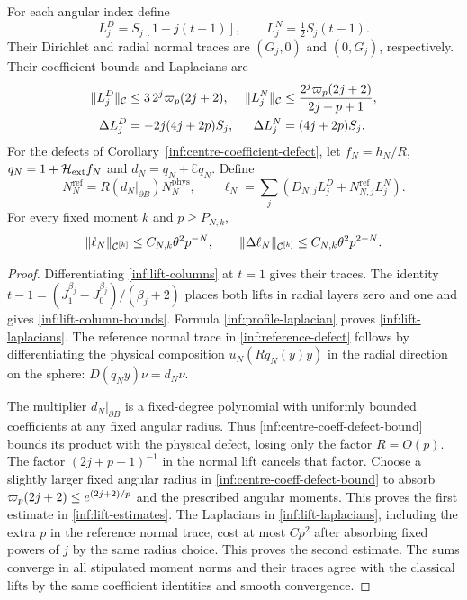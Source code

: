 \begin{lemma}\label{inf:double-lift}
For each angular index define
\begin{equation}\label{inf:lift-columns}
 L_j^D=S_j[1-j(t-1)],\qquad L_j^N=\tfrac12S_j(t-1).
\end{equation}
Their Dirichlet and radial normal traces are $(G_j,0)$ and
$(0,G_j)$, respectively. Their coefficient bounds and Laplacians
are
\begin{align}
 \lVert L_j^D\rVert_\mathcal C&\le3\,2^j\varpi_p(2j+2),&
 \lVert L_j^N\rVert_\mathcal C&\le\frac{2^j\varpi_p(2j+2)}{2j+p+1},
 \label{inf:lift-column-bounds}\\
 \Delta L_j^D&=-2j(4j+2p)S_j,&
 \Delta L_j^N&=(4j+2p)S_j.\label{inf:lift-laplacians}
\end{align}
For the defects of Corollary~\ref{inf:centre-coefficient-defect},
let $f_N=h_N/R$, $q_N=1+\mathcal H_{\mathrm{ext}} f_N$ and
$d_N=q_N+\Euler q_N$. Define
\begin{equation}\label{inf:reference-defect}
 N_N^{\mathrm{ref}}=R(d_N|_{\partial B})N_N^{\mathrm{phys}},
 \qquad
 \ell_N=\sum_j(D_{N,j}L_j^D+N_{N,j}^{\mathrm{ref}}L_j^N).
\end{equation}
For every fixed moment $k$ and $p\ge P_{N,k}$,
\begin{equation}\label{inf:lift-estimates}
 \lVert \ell_N\rVert_{\mathcal C^{[k]}}\le C_{N,k}\theta^2p^{-N},\qquad
 \lVert \Delta\ell_N\rVert_{\mathcal C^{[k]}}\le C_{N,k}\theta^2p^{2-N}.
\end{equation}
\end{lemma}
\begin{proof}
Differentiating \eqref{inf:lift-columns} at $t=1$ gives their
traces. The identity
$t-1=(J_1^{\beta_j}-J_0^{\beta_j})/(\beta_j+2)$
places both lifts in radial layers zero and one and gives
\eqref{inf:lift-column-bounds}. Formula
\eqref{inf:profile-laplacian} proves \eqref{inf:lift-laplacians}.
The reference normal trace in \eqref{inf:reference-defect} follows
by differentiating the physical composition $u_N(Rq_N(y)y)$ in
the radial direction on the sphere: $D(q_Ny)\nu=d_N\nu$.

The multiplier $d_N|_{\partial B}$ is a fixed-degree polynomial
with uniformly bounded coefficients at any fixed angular radius.
Thus \eqref{inf:centre-coeff-defect-bound} bounds its product with
the physical defect, losing only the factor $R=O(p)$.
The factor $(2j+p+1)^{-1}$ in the normal lift cancels that factor.
Choose a slightly larger fixed angular radius in
\eqref{inf:centre-coeff-defect-bound} to absorb
$\varpi_p(2j+2)\le e^{(2j+2)/p}$ and the prescribed angular moments.
This proves the first estimate in \eqref{inf:lift-estimates}.
The Laplacians in \eqref{inf:lift-laplacians}, including the extra
$p$ in the reference normal trace, cost at most $C p^2$ after
absorbing fixed powers of $j$ by the same radius choice. This proves
the second estimate. The sums converge in all stipulated moment
norms and their traces agree with the classical lifts by the same
coefficient identities and smooth convergence.
\end{proof}

